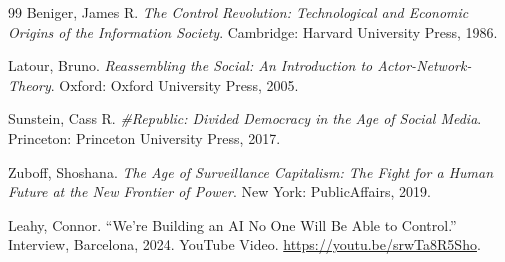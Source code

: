 \documentclass[12pt]{article}
\begin{document}
\begin{thebibliography}{99}
Beniger, James R.
\textit{The Control Revolution: Technological and Economic Origins of the Information Society}.
Cambridge: Harvard University Press, 1986.

Latour, Bruno.
\textit{Reassembling the Social: An Introduction to Actor-Network-Theory}.
Oxford: Oxford University Press, 2005.

Sunstein, Cass R.
\textit{\#Republic: Divided Democracy in the Age of Social Media}.
Princeton: Princeton University Press, 2017.

Zuboff, Shoshana.
\textit{The Age of Surveillance Capitalism: The Fight for a Human Future at the New Frontier of Power}.
New York: PublicAffairs, 2019.

Leahy, Connor.
``We're Building an AI No One Will Be Able to Control.''
Interview, Barcelona, 2024.
YouTube Video.
\url{https://youtu.be/srwTa8R5Sho}.

\end{thebibliography}
\end{document}
